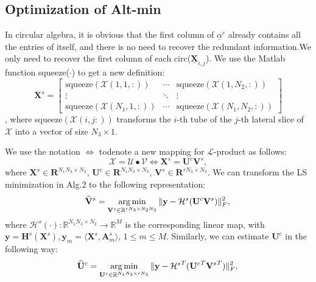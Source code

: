 \documentclass[journal,article,submit,moreauthors,pdftex,10pt,a4paper]{Definitions/mdpi}
\theoremstyle{plain}
\theoremstyle{definition}
\theoremstyle{remark}
\begin{document}
\subsection{Optimization of Alt-min}
In circular algebra, it is obvious that the first column of $\underline{\alpha}^c$ already contains all the entries of itself, and there is no need to recover the redundant information.We only need to recover the first column of each circ($\underline{\mathbf{X}}_{i,j}$). We use the Matlab function squeeze($\cdot$)  to get a new definition:
\[
    \mathbf{X}^s = \begin{bmatrix}
        \text{squeeze}(\mathcal{X}(1,1,:)) & \cdots & \text{squeeze}(\mathcal{X}(1,N_2,:)) \\
        \vdots & \ddots & \vdots \\
        \text{squeeze}(\mathcal{X}(N_1,1,:)) & \cdots & \text{squeeze}(\mathcal{X}(N_1,N_2,:))
    \end{bmatrix}
\],
where squeeze$(\mathcal{X}(i,j:))$ transforms the $i$-th tube of the $j$-th lateral slice of $\mathcal{X}$ into a vector of size $N_3 \times 1$.

We use the notation $\Leftrightarrow$ todenote a new mapping for $\mathcal{L}$-product as follows:
\begin{equation}
    \mathcal{X} = \mathcal{U}\bullet \mathcal{V} \Leftrightarrow \mathbf{X}^s = \mathbf{U}^c\mathbf{V}^s,
\end{equation}
where $\mathbf{X}^s \in \mathbf{R}^{N_1N_3 \times N_2}$, $\mathbf{U}^c \in \mathbf{R}^{N_1N_3 \times N_3}$, $\mathbf{V}^s \in \mathbf{R}^{rN_3 \times N_2}$. We can transform the LS minimization in Alg.2 to the following representation:
\begin{equation}
    \widehat{\mathbf{V}}^s = 
    \mathop{\arg\min}_{ \mathbf{V}^s \in \mathbb{R}^{rN_3 \times N_2N_3}} \| \mathbf{y} - \mathcal{H}^s(\mathbf{U}^c\mathbf{V}^s) \|_F^2 , \\
\end{equation}
where $\mathcal{H}^s(\cdot):\mathbb{R}^{N_1N_3\times N_2} \to \mathbb{R}^{M}$ is the corresponding linear map, with $\mathbf{y} = \mathbf{H}^s(\mathbf{X}^s), \mathbf{y}_m = \langle \mathbf{X}^s, \mathbf{A}^s_m \rangle$, $1 \leq m \leq M$.
Similarly, we can estimate $\mathbf{U}^c$ in the following way:
\begin{equation}
    \widehat{\mathbf{U}}^c = 
    \mathop{\arg\min}_{ \mathbf{U}^c \in \mathbb{R}^{N_1N_3 \times rN_3}} \| \mathbf{y} - {\mathcal{H}^s}^T({\mathbf{U}^c}^T{\mathbf{V}^s}^T) \|_F^2 , \\
\end{equation}
\end{document}
